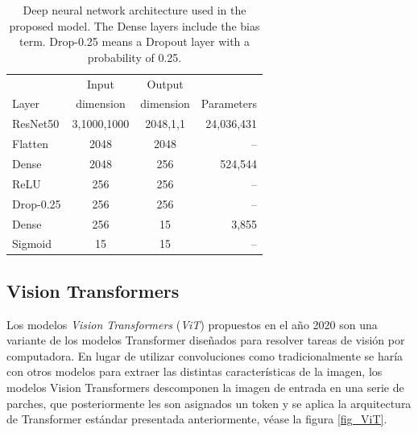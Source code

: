 {\begin{table}[!ht]
    \centering
    \begin{tabular}{| l|c | c | r |}
    \hline
                 &     Input   &  Output    &  \\
    Layer        &   dimension & dimension  & Parameters \\
    \hline\hline
    ResNet50     &     3,1000,1000 &     2048,1,1 & 24,036,431 \\
    Flatten      &     2048        &     2048     &  --        \\
    Dense        &     2048        &     256      & 524,544    \\
    ReLU         &     256         &     256      & --         \\
    Drop-0.25  &     256         &     256      & --         \\
    Dense        &     256         &     15       &  3,855     \\
    Sigmoid      &     15          &     15       & --         \\
    \hline
    \end{tabular}
    \caption{Deep neural network architecture used in the proposed model. The Dense layers include the bias term. Drop-0.25 means a Dropout layer with a probability of 0.25.}
    \label{table_resnet50}
\end{table}

\subsection{Vision Transformers}

Los modelos \textit{Vision Transformers} (\textit{ViT}) \cite{DBLP:journals/corr/abs-2010-11929} propuestos en el
año 2020 son una variante de los modelos Transformer diseñados para resolver tareas de visión por
computadora. En lugar de utilizar convoluciones como tradicionalmente se haría con otros modelos
para extraer las distintas características de la imagen, los modelos Vision Transformers descomponen
la imagen de entrada en una serie de parches, que posteriormente les son asignados un token y se
aplica la arquitectura de Transformer estándar presentada anteriormente, véase la figura \ref{fig_ViT}.

}
